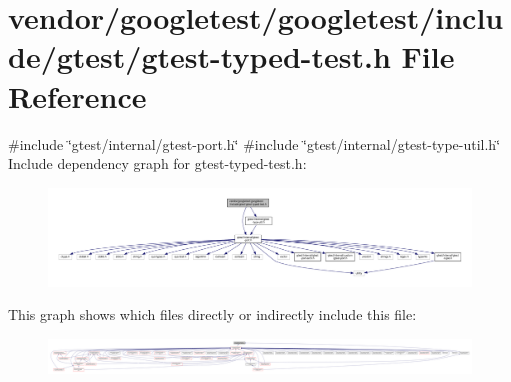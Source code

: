 \hypertarget{gtest-typed-test_8h}{}\section{vendor/googletest/googletest/include/gtest/gtest-\/typed-\/test.h File Reference}
\label{gtest-typed-test_8h}
{\ttfamily \#include \char`\"{}gtest/internal/gtest-\/port.\+h\char`\"{}}\newline
{\ttfamily \#include \char`\"{}gtest/internal/gtest-\/type-\/util.\+h\char`\"{}}\newline
Include dependency graph for gtest-\/typed-\/test.h\+:
\nopagebreak
\begin{figure}[H]
\begin{center}
\leavevmode
\includegraphics[width=350pt]{gtest-typed-test_8h__incl}
\end{center}
\end{figure}
This graph shows which files directly or indirectly include this file\+:
\nopagebreak
\begin{figure}[H]
\begin{center}
\leavevmode
\includegraphics[width=350pt]{gtest-typed-test_8h__dep__incl}
\end{center}
\end{figure}
